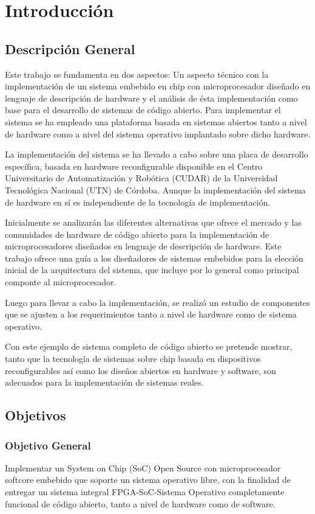\chapter{Introducción}

\section{Descripción General}
Este trabajo se fundamenta en dos aspectos: Un aspecto técnico con la implementación de un sistema embebido en chip con microprocesador diseñado
en lenguaje de descripción de hardware y el análisis de ésta implementación como base para el desarrollo de sistemas de código abierto.
Para implementar el sistema se ha empleado una plataforma basada en sistemas abiertos tanto a nivel de hardware como a nivel del sistema operativo
implantado sobre dicho hardware.

La implementación del sistema se ha llevado a cabo sobre una placa de desarrollo específica, basada en hardware reconfigurable disponible en el
Centro Universitario de Automatización y Robótica (CUDAR) de la Universidad Tecnológica Nacional (UTN) de Córdoba. Aunque la implementación del
sistema de hardware en sí es independiente de la tecnología de implementación.

Inicialmente se analizarán las diferentes alternativas que ofrece el mercado y las comunidades de hardware de código abierto para la
implementación de microprocesadores diseñados en lenguaje de descripción de hardware. Este trabajo ofrece una guía a los diseñadores de
sistemas embebidos para la elección inicial de la arquitectura del sistema, que incluye por lo general como principal componte al microprocesador.

Luego para llevar a cabo la implementación, se realizó un estudio de componentes que se ajusten a los requerimientos tanto a nivel de hardware como
de sistema operativo.

Con este ejemplo de sistema completo de código abierto se pretende mostrar, tanto que la tecnología de sistemas sobre chip basada en dispositivos
reconfigurables así como los diseños abiertos en hardware y software, son adecuados para la implementación de sistemas reales.

\section{Objetivos}
\subsection{Objetivo General}
Implementar un System on Chip (SoC) Open Source con microprocesador softcore embebido que soporte un sistema operativo libre, con la finalidad de
entregar un sistema integral FPGA-SoC-Sistema Operativo completamente funcional de código abierto, tanto a nivel de hardware como de software.


